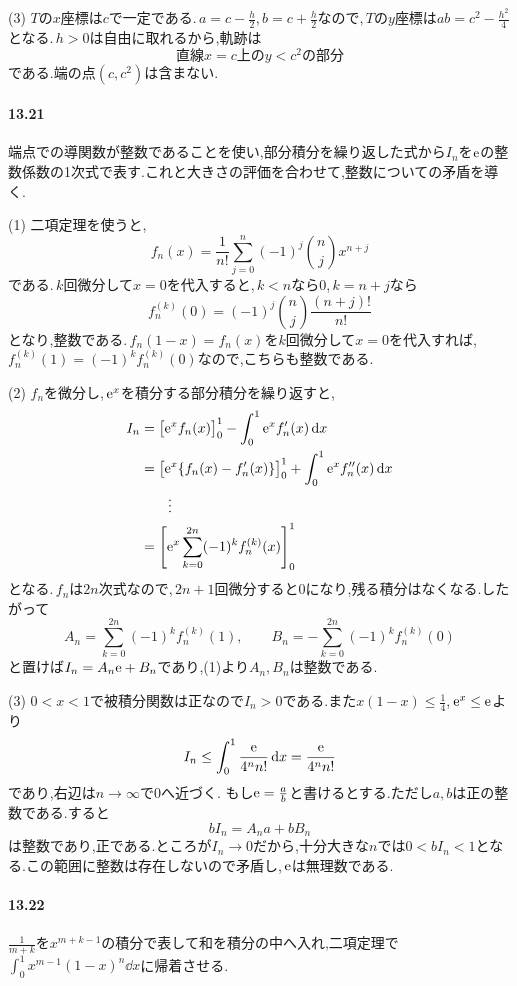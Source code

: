 (3) $T$の$x$座標は$c$で一定である.\,$a=c-\frac h2$,\,$b=c+\frac h2$なので,\,$T$の$y$座標は$ab=c^2-\frac{h^2}{4}$となる.\,$h>0$は自由に取れるから,軌跡は
\[
 \boxed{\text{直線$x=c$上の$y<c^2$の部分}}
\]
である.端の点$(c,c^2)$は含まない.

\paragraph{13.21}
端点での導関数が整数であることを使い,部分積分を繰り返した式から$I_n$を$\mathrm{e}$の整数係数の1次式で表す.これと大きさの評価を合わせて,整数についての矛盾を導く.

(1) 二項定理を使うと,
\[
 f_n(x)=\frac1{n!}\sum_{j=0}^n(-1)^j\binom nj x^{n+j}
\]
である.\,$k$回微分して$x=0$を代入すると,\,$k<n$なら$0$,\,$k=n+j$なら
\[
 f_n^{(k)}(0)=(-1)^j\binom nj\frac{(n+j)!}{n!}
\]
となり,整数である.\,$f_n(1-x)=f_n(x)$を$k$回微分して$x=0$を代入すれば,\,$f_n^{(k)}(1)=(-1)^k f_n^{(k)}(0)$なので,こちらも整数である.

(2) $f_n$を微分し,\,$\mathrm{e}^x$を積分する部分積分を繰り返すと,
\[
 \begin{aligned}
 I_n&=\bigl[\mathrm{e}^xf_n(x)\bigr]_0^1-\int_0^1\mathrm{e}^xf_n'(x)\,\mathrm{d} x\\
 &=\bigl[\mathrm{e}^x\{f_n(x)-f_n'(x)\}\bigr]_0^1+\int_0^1\mathrm{e}^xf_n''(x)\,\mathrm{d} x\\
 &\qquad\vdots\\
 &=\left[\mathrm{e}^x\sum_{k=0}^{2n}(-1)^k f_n^{(k)}(x)\right]_0^1
 \end{aligned}
\]
となる.\,$f_n$は$2n$次式なので,\,$2n+1$回微分すると$0$になり,残る積分はなくなる.したがって
\[
 A_n=\sum_{k=0}^{2n}(-1)^kf_n^{(k)}(1),\qquad
 B_n=-\sum_{k=0}^{2n}(-1)^kf_n^{(k)}(0)
\]
と置けば$I_n=A_n\mathrm{e}+B_n$であり,(1)より$A_n,B_n$は整数である.

(3) $0<x<1$で被積分関数は正なので$I_n>0$である.また$x(1-x)\le\frac14$,\,$\mathrm{e}^x\le\mathrm{e}$より
\[
 I_n\le\int_0^1\frac{\mathrm{e}}{4^n n!}\,\mathrm{d} x=\frac{\mathrm{e}}{4^n n!}
\]
であり,右辺は$n\to\infty$で$0$へ近づく.
もし$\mathrm{e}=\frac ab$と書けるとする.ただし$a,b$は正の整数である.すると
\[
 bI_n=A_na+bB_n
\]
は整数であり,正である.ところが$I_n\to0$だから,十分大きな$n$では$0<bI_n<1$となる.この範囲に整数は存在しないので矛盾し,\,$\mathrm{e}$は無理数である.

\paragraph{13.22}
$\frac1{m+k}$を$x^{m+k-1}$の積分で表して和を積分の中へ入れ,二項定理で$\int_0^1x^{m-1}(1-x)^n\dd x$に帰着させる.

